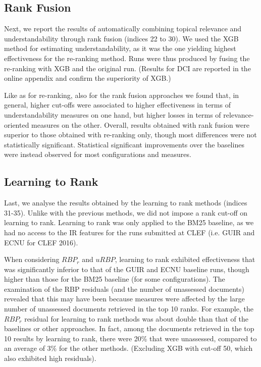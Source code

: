 \vspace{-6pt}
\subsection{Rank Fusion}
\label{results:fusion}

Next, we report the results of automatically combining topical relevance and understandability through rank fusion (indices 22 to 30). We used the XGB method for estimating understandability, as it was the one yielding highest effectiveness for the re-ranking method. Runs were thus produced by fusing the re-ranking with XGB and the original run. (Results for DCI are reported in the online appendix and confirm the superiority of XGB.) 

Like as for re-ranking, also for the rank fusion approaches we found that, in general, higher cut-offs were associated to higher effectiveness in terms of understandability measures on one hand, but higher losses in terms of relevance-oriented measures on the other. Overall, results obtained with rank fusion were superior to those obtained with re-ranking only, though most differences were not statistically significant. Statistical significant improvements over the baselines were instead observed for most configurations and measures.  

\vspace{-6pt}
\subsection{Learning to Rank}
\label{results:ltr}
\vspace{-2pt}

Last, we analyse the results obtained by the learning to rank methods (indices 31-35). Unlike with the previous methods, we did not impose a rank cut-off on learning to rank. Learning to rank was only applied to the BM25 baseline, as we had no access to the IR features for the runs submitted at CLEF (i.e. GUIR and ECNU for CLEF 2016).

When considering $RBP_r$ and $uRBP$, learning to rank exhibited effectiveness that was significantly inferior to that of the GUIR and ECNU baseline runs, though higher than those for the BM25 baseline (for some configurations). The examination of the RBP residuals (and the number of unassessed documents) revealed that this may have been because measures were affected by the large number of unassessed documents retrieved in the top 10 ranks. For example, the $RBP_r$ residual for learning to rank methods was about double than that of the baselines or other approaches. In fact, among the documents retrieved in the top 10 results by learning to rank, there were 20\% that were unassessed, compared to an average of 3\% for the other methods. (Excluding XGB with cut-off 50, which also exhibited high residuals). 

